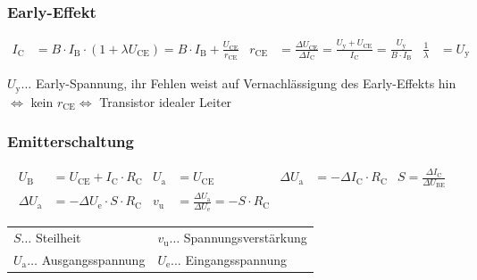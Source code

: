 		\subsubsection{Early-Effekt}
			\begin{align*}
				I_{\mathrm{C}}&=B\cdot I_{\mathrm{B}}\cdot(1+\lambda U_{\mathrm{CE}})=B\cdot I_{\mathrm{B}}+\frac{U_{\mathrm{CE}}}{r_{\mathrm{CE}}} 
				& r_{\mathrm{CE}}&=\frac{\Delta U_{\mathrm{CE}}}{\Delta I_{\mathrm{C}}}=\frac{U_{\mathrm{y}}+U_{\mathrm{CE}}}{I_{\mathrm{C}}}=\frac{U_{\mathrm{y}}}{B\cdot I_{\mathrm{B}}}
				& \frac{1}{\lambda} &= U_{\mathrm{y}}
			\end{align*}

			$U_{\mathrm{y}}\dots$ Early-Spannung, ihr Fehlen weist auf Vernachlässigung des Early-Effekts hin $\Leftrightarrow$ kein $r_{\mathrm{CE}} \Leftrightarrow$ Transistor idealer Leiter

		\subsubsection{Emitterschaltung}
			\begin{align*}
				U_{\mathrm{B}}&=U_{\mathrm{CE}}+I_{\mathrm{C}}\cdot R_{\mathrm{C}} 
				& U_{\mathrm{a}}&=U_{\mathrm{CE}} & \Delta U_{\mathrm{a}}&=-\Delta I_{\mathrm{C}}\cdot R_{\mathrm{C}} 
				& S=\frac{\Delta I_{\mathrm{C}}}{\Delta U_{\mathrm{BE}}}\\
				\Delta U_{\mathrm{a}}&=-\Delta U_{\mathrm{e}}\cdot S\cdot R_{\mathrm{C}} 
				& v_{\mathrm{u}}&=\frac{\Delta U_{\mathrm{a}}}{\Delta U_{\mathrm{e}}}=-S\cdot R_{\mathrm{C}}
			\end{align*}
			\begin{table}[h]
			\begin{tabular}{ll}
			$S\dots$ Steilheit & $v_{\mathrm{u}}\dots$ Spannungsverstärkung\\
			$U_{\mathrm{a}}\dots$ Ausgangsspannung & $U_{\mathrm{e}}\dots$ Eingangsspannung\\
			\end{tabular}
			\end{table}
